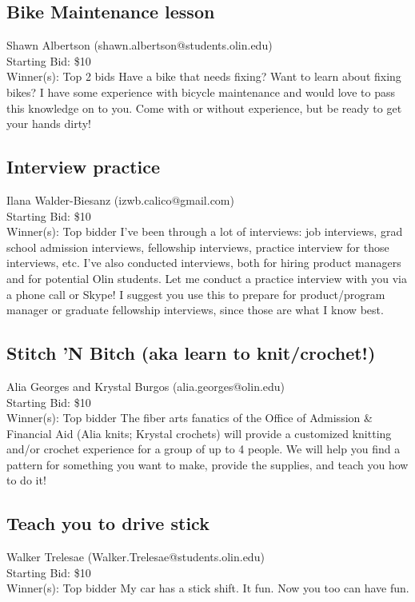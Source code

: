\documentclass[11pt]{article}
\begin{document}
\subsection{Bike Maintenance lesson}
Shawn Albertson (shawn.albertson@students.olin.edu) \\
Starting Bid: \$10 \\
Winner(s): 
Top 2 bids\newline
Have a bike that needs fixing? Want to learn about fixing bikes? I have some experience with bicycle maintenance and would love to pass this knowledge on to you. Come with or without experience, but be ready to get your hands dirty!
\subsection{Interview practice}
Ilana Walder-Biesanz (izwb.calico@gmail.com) \\
Starting Bid: \$10 \\
Winner(s): 
Top bidder\newline
I've been through a lot of interviews: job interviews, grad school admission interviews, fellowship interviews, practice interview for those interviews, etc. I've also conducted interviews, both for hiring product managers and for potential Olin students. Let me conduct a practice interview with you via a phone call or Skype! I suggest you use this to prepare for product/program manager or graduate fellowship interviews, since those are what I know best.
\subsection{Stitch 'N Bitch (aka learn to knit/crochet!)}
Alia Georges and Krystal Burgos (alia.georges@olin.edu) \\
Starting Bid: \$10 \\
Winner(s): 
Top bidder\newline
The fiber arts fanatics of the Office of Admission \& Financial Aid (Alia knits; Krystal crochets) will provide a customized knitting and/or crochet experience for a group of up to 4 people. We will help you find a pattern for something you want to make, provide the supplies, and teach you how to do it!
\subsection{Teach you to drive stick}
Walker Trelesae (Walker.Trelesae@students.olin.edu) \\
Starting Bid: \$10 \\
Winner(s): 
Top bidder\newline
My car has a stick shift. It fun. Now you too can have fun.
\end{document}
